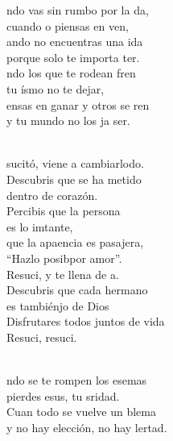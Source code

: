 \documentclass[12pt]{article}
\begin{document}
\begin{multicols*}{2}
\begin{cancion}%
	ndo vas sin rumbo por la da,\\
	cuando o piensas en ven,\\
	ando no encuentras una ida\\
	porque solo te importa ter.\\
	ndo los que te rodean fren\\
	tu ísmo no te dejar,\\
	ensas en ganar y otros se ren\\
	y tu mundo no los ja ser.\\\jump\\
	\begin{chorus}%
	sucitó, viene a cambiarlodo.\\
	Descubris que se ha metido  \\
	dentro de corazón.\\
	Percibis que la persona  \\
	es lo imtante,\\
	que la apaencia es pasajera,\\
	“Hazlo posibpor amor”.\\
	Resuci, y te llena de a. \\
	Descubris que cada hermano  \\
	es tambiénjo de Dios\\
	Disfrutares todos juntos de vida\\
	Resuci, resuci. \\
	\end{chorus}%
	\jump\\
	ndo se te rompen los esemas\\
	pierdes esus, tu sridad.\\
	Cuan todo se vuelve un blema\\
	y no hay elección, no hay lertad.\\

\end{cancion}
\end{multicols*}
\end{document}

